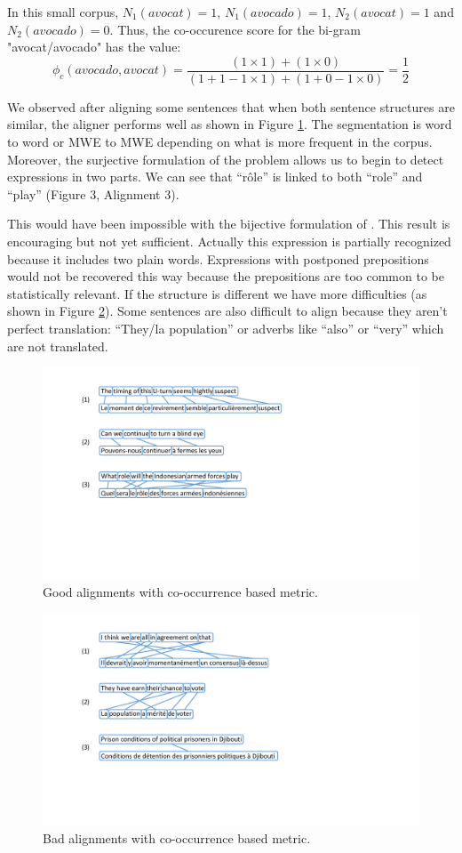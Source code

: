 \documentclass[output=paper,modfonts,nonflat]{langsci/langscibook}
\begin{document}
In this small corpus, $N_1(avocat) = 1$, $N_1(avocado) = 1$, $N_2(avocat) = 1$ and $N_2(avocado) = 0$. Thus, the co-occurence score for the bi-gram "avocat/avocado" has the value:
\begin{equation}
\phi_{c}(avocado,avocat) = \frac{(1 \times 1) + (1 \times 0)}{(1 + 1 -1 \times 1) + (1 + 0 - 1 \times 0)} = \frac{1}{2}
\end{equation}

We observed after aligning some sentences that when both sentence structures are similar, the aligner performs well as shown in Figure \ref{fig:goodali}. The segmentation is word to word or MWE to MWE depending on what is more frequent in the corpus. Moreover, the surjective formulation of the problem allows us to begin to detect expressions in two parts. 
We can see that ``rôle'' is linked to both ``role'' and ``play'' (Figure 3, Alignment 3).

This would have been impossible with the bijective formulation of \citep{denero2008complexity}. This result is encouraging but not yet sufficient. 
Actually this expression is partially recognized because it includes two plain words. 
Expressions with postponed prepositions would not be recovered this way because the prepositions are too common to be statistically relevant.
If the structure is different we have more difficulties (as shown in Figure \ref{fig:badali}). 
Some sentences are also difficult to align because they aren't perfect translation: 
``They/la population'' or adverbs like ``also'' or ``very'' which are not translated.

\begin{figure}
\centering
\includegraphics[width=0.6\linewidth]{figures/Figure_goodAli}
\caption{\label{fig:goodali}Good alignments with co-occurrence based metric.}
\end{figure}

\begin{figure}
\centering
\includegraphics[width=0.6\linewidth]{figures/Figure_badAli}
\caption{\label{fig:badali}Bad alignments with co-occurrence based metric.}
\end{figure}
\end{document}
